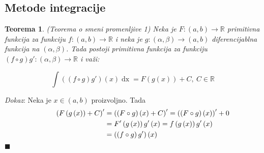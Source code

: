 \documentclass{article}
\newtheorem{teorema}{Teorema}[section]
\DeclareMathOperator{\dx}{dx}
\begin{document}
\subsection{Metode integracije}

\begin{teoremabox}
    \label{teorema_1.2}
    \begin{teorema}
        (Teorema o smeni promenljive 1) Neka je $F: \left(a, b\right) \longrightarrow \mathbb{R}$ primitivna funkcija za funkciju $f:\left(a, b\right) \longrightarrow \mathbb{R}$ i neka je $g: \left(\alpha, \beta\right) \longrightarrow \left(a, b\right)$ diferencijablna funkcija na $\left(\alpha, \beta\right)$. Tada postoji primitivna funkcija za funkciju $\left(f\circ g\right) g' : \left(\alpha, \beta\right) \longrightarrow \mathbb{R}$ i važi:\par
        \begin{equation*}
            \int \left(\left(f\circ g\right) g'\right)\left(x\right)\dx = F\left(g\left(x\right)\right) + C,\ C\in\mathbb{R}
        \end{equation*}
    \end{teorema}
\end{teoremabox}
\textit{Dokaz}: Neka je $x \in \left(a, b\right)$ proizvoljno. Tada
\begin{align*}
    \hspace*{1cm}    \left(F\left(g\left(x\right)\right) + C\right)' & = \left(\left(F \circ g\right)\left(x\right) + C\right)'  = \left(\left(F \circ g\right)\left(x\right)\right)' + 0 \\
                                                                     & = F'\left(g\left(x\right)\right)  g'\left(x\right)        = f\left(g\left(x\right)\right)  g'\left(x\right)        \\
                                                                     & = \left(\left(f \circ g\right)  g'\right)\left(x\right)
\end{align*}
\null\hfill $\blacksquare$\par
\end{document}
